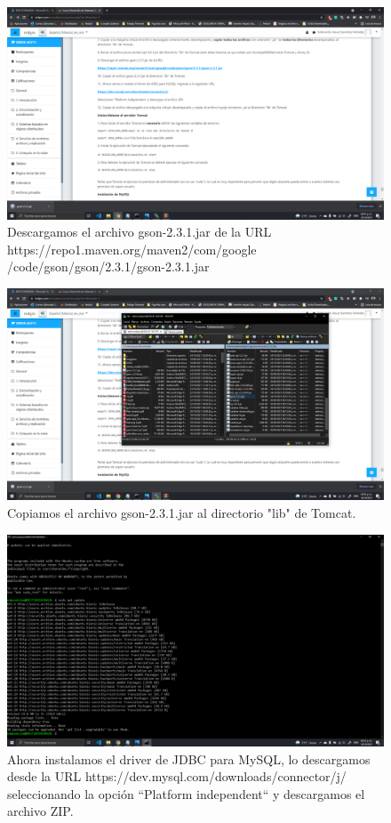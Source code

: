 \documentclass[11pt]{article}
\begin{document}
		\begin{figure}[H]
			\centering
			\includegraphics[scale=0.34]{resources/p9.png}
			\caption{Descargamos el archivo gson-2.3.1.jar de la URL https://repo1.maven.org/maven2/com/google
			/code/gson/gson/2.3.1/gson-2.3.1.jar}\label{fig:picture}
		\end{figure}
		\begin{figure}[H]
			\centering
			\includegraphics[scale=0.34]{resources/p10.png}
			\caption{Copiamos el archivo gson-2.3.1.jar al directorio "lib" de Tomcat.}\label{fig:picture}
		\end{figure}
		\begin{figure}[H]
			\centering
			\includegraphics[scale=0.34]{resources/p2.1.png}
			\caption{Ahora instalamos el driver de JDBC para MySQL, lo descargamos desde la URL
https://dev.mysql.com/downloads/connector/j/ seleccionando la opción “Platform independent“ y descargamos el archivo ZIP.}\label{fig:picture}
		\end{figure}
\end{document}
